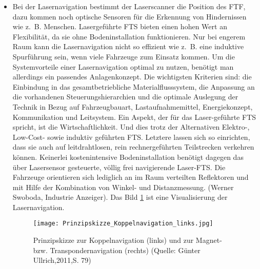 \begin{itemize}
\begin{itemize}
=======
	\item Bei der Lasernavigation bestimmt der Laserscanner die Position des FTF, dazu kommen noch optische Sensoren f\"ur die Erkennung von Hindernissen wie z.~B. Menschen.
Lasergef\"uhrte FTS bieten einen hohen Wert an Flexibilit\"at, da sie ohne Bodeninstallation funktionieren.
Nur bei engerem Raum kann die Lasernavigation nicht so effizient wie z.~B. eine induktive Spurf\"uhrung sein, wenn viele Fahrzeuge zum Einsatz kommen.
Um die Systemvorteile einer Lasernavigation optimal zu nutzen, ben\"otigt man allerdings ein passendes Anlagenkonzept.
Die wichtigsten Kriterien sind: die Einbindung in das gesamtbetriebliche Materialflusssystem, die Anpassung an die vorhandenen Steuerungshierarchien und die optimale Auslegung der Technik in Bezug auf Fahrzeugbauart, Lastaufnahmemittel, Energiekonzept, Kommunikation und Leitsystem.
Ein Aspekt, der f\"ur das Laser-gef\"uhrte FTS spricht, ist die Wirtschaftlichkeit.
Und dies trotz der Alternativen Elektro-, Low-Cost- sowie induktiv gef\"uhrten FTS.
Letztere lassen sich so einrichten, dass sie auch auf leitdrahtlosen, rein rechnergef\"uhrten Teilstrecken verkehren k\"onnen.
Keinerlei kostenintensive Bodeninstallation ben\"otigt dagegen das \"uber Lasersensor gesteuerte, v\"ollig frei navigierende Laser-FTS.
Die Fahrzeuge orientieren sich lediglich an im Raum verteilten Reflektoren und mit Hilfe der Kombination von Winkel- und Distanzmessung. (Werner Swoboda, Industrie Anzeiger). Das Bild \ref{Prinzipskizze_Koppelnavigation_links} ist eine Visualisierung der Lasernavigation.
	\begin{figure}[h!]
		\centering
		\texttt{[image: Prinzipskizze\_Koppelnavigation\_links.jpg]}
		\caption{Prinzipskizze zur Koppelnavigation (links) und zur Magnet- bzw. Transpondernavigation (rechts) (Quelle: G\"unter Ullrich,2011,S. 79)}
		\label{Prinzipskizze_Koppelnavigation_links}
	\end{figure}


\end{itemize}
\end{itemize}
